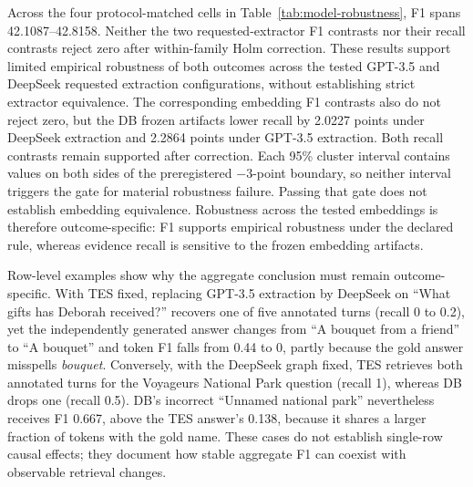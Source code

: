 \documentclass[10pt,twocolumn]{article}
\begin{document}
Across the four protocol-matched cells in
Table~\ref{tab:model-robustness}, F1 spans 42.1087--42.8158. Neither the two
requested-extractor F1 contrasts nor their recall contrasts reject zero after
within-family Holm correction. These results support limited empirical
robustness of both outcomes across the tested GPT-3.5 and DeepSeek requested
extraction configurations, without establishing strict extractor
equivalence. The corresponding embedding F1 contrasts also do not reject
zero, but the DB frozen artifacts lower recall by 2.0227 points under
DeepSeek extraction and
2.2864 points under GPT-3.5 extraction. Both recall contrasts remain supported
after correction. Each 95\% cluster interval contains values on both sides of
the preregistered $-3$-point boundary, so neither interval triggers the gate
for material robustness failure. Passing that gate does not establish
embedding equivalence. Robustness across the tested embeddings is therefore
outcome-specific: F1 supports empirical robustness under the declared rule,
whereas evidence recall is sensitive to the frozen embedding artifacts.

Row-level examples show why the aggregate conclusion must remain
outcome-specific. With TES fixed, replacing GPT-3.5 extraction by DeepSeek on
``What gifts has Deborah received?'' recovers one of five annotated turns
(recall 0 to 0.2), yet the independently generated answer changes from ``A
bouquet from a friend'' to ``A bouquet'' and token F1 falls from 0.44 to 0,
partly because the gold answer misspells \emph{bouquet}. Conversely, with the
DeepSeek graph fixed, TES retrieves both annotated turns for the Voyageurs
National Park question (recall 1), whereas DB drops one (recall 0.5). DB's
incorrect ``Unnamed national park'' nevertheless receives F1 0.667, above the
TES answer's 0.138, because it shares a larger fraction of tokens with the
gold name. These cases do not establish single-row causal effects; they
document how stable aggregate F1 can coexist with observable retrieval
changes.
\end{document}
